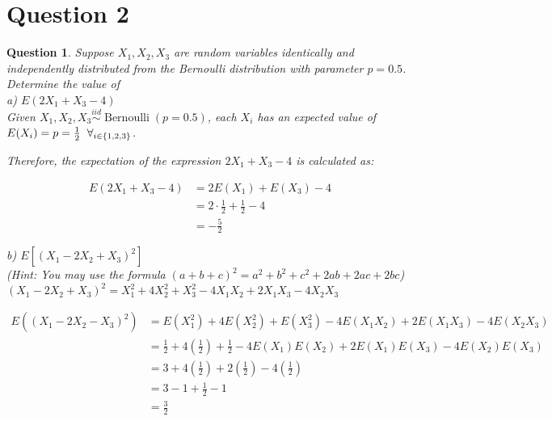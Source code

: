 \documentclass{article}
\theoremstyle{questionstyle}
\newtheorem{myquestion}{Question}
\begin{document}
\section{Question 2}
\begin{myquestion}
   Suppose \(X_1, X_2, X_3\) are random variables identically and independently
distributed from the Bernoulli distribution with parameter $p = 0.5$. Determine the value of\\

a) \(E(2X_1 + X_3 -4)\)\\

Given \(X_1, X_2, X_3 \overset{iid}{\sim} \operatorname{Bernoulli}(p=0.5)\), each \(X_i\) has an expected value of \( E(X_i) = p = \frac{1}{2} \hspace{.2cm} \forall_{i\in \{1,2,3\}}\).

Therefore, the expectation of the expression \(2X_1 + X_3 - 4\) is calculated as:

\begin{align*}
    E(2X_1 + X_3 - 4) &= 2E(X_1) + E(X_3) - 4\\ 
    &= 2 \cdot \frac{1}{2} + \frac{1}{2} - 4\\ 
    &= -\frac{5}{2}
\end{align*}

b) \(E[(X_1 −2X_2 +X_3)^2]\)\\

(Hint: You may use the formula $(a+b+c)^2 = a^2 +b^2 +c^2 +2ab+2ac+2bc$)\\

\((X_1 - 2X_2 + X_3)^2 = X_1^2 + 4X_2^2 + X_3^2 -4X_1X_2 + 2X_1X_3 -4X_2X_3\)

\begin{align*}
    E((X_1 - 2X_2 -X_3)^2) &= E(X_1^2) + 4E(X_2^2) + E(X_3^2) -4E(X_1X_2) + 2E(X_1X_3) -4E(X_2X_3)\\
    &= \frac{1}{2} + 4\left(\frac{1}{2}\right) + \frac{1}{2} - 4E(X_1)E(X_2) + 2E(X_1)E(X_3) - 4E(X_2)E(X_3)\\
    &= 3 + 4\left(\frac{1}{2}\right) + 2\left(\frac{1}{2}\right) - 4\left(\frac{1}{2}\right)\\
    &= 3 -1 +\frac{1}{2} - 1\\
    &= \frac{3}{2}
\end{align*}
\end{myquestion} %
\end{document}
